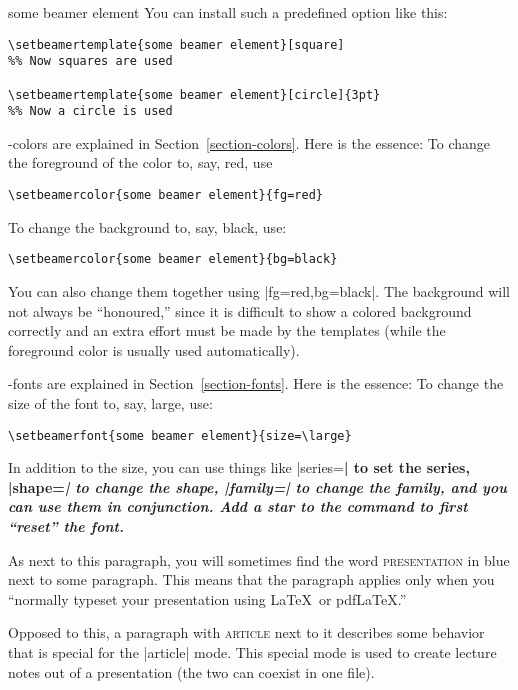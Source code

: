 \begin{element}{some beamer element}
  You can install such a predefined option like this:
\begin{verbatim}
\setbeamertemplate{some beamer element}[square]
%% Now squares are used

\setbeamertemplate{some beamer element}[circle]{3pt}
%% Now a circle is used
\end{verbatim}

  \beamer-colors are explained in Section~\ref{section-colors}. Here is the essence: To change the foreground of the color to, say, red, use
\begin{verbatim}
\setbeamercolor{some beamer element}{fg=red}
\end{verbatim}

  To change the background to, say, black, use:
\begin{verbatim}
\setbeamercolor{some beamer element}{bg=black}
\end{verbatim}

  You can also change them together using |fg=red,bg=black|. The background will not always be ``honoured,'' since it is difficult to show a colored background correctly and an extra effort must be made by the templates (while the foreground color is usually used automatically).

  \beamer-fonts are explained in Section~\ref{section-fonts}. Here is the essence: To change the size of the font to, say, large, use:
\begin{verbatim}
\setbeamerfont{some beamer element}{size=\large}
\end{verbatim}

  In addition to the size, you can use things like |series=\bfseries| to set the series, |shape=\itshape| to change the shape, |family=\sffamily| to change the family, and you can use them in conjunction. Add a star to the command to first ``reset'' the font.
\end{element}

\beamernote
As next to this paragraph, you will sometimes find the word \textsc{presentation} in blue next to some paragraph. This means that the paragraph applies only when you ``normally typeset your presentation using \LaTeX\ or pdf\LaTeX.''

\articlenote
Opposed to this, a paragraph with \textsc{article} next to it describes some behavior that is special for the |article| mode. This special mode is used to create lecture notes out of a presentation (the two can coexist in one file).

\endgroup


